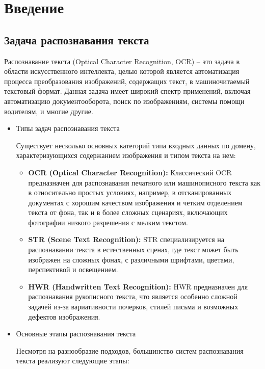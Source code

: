 \section{Введение}
\label{sec:Chapter0} 
\subsection{Задача распознавания текста}
Распознавание текста (Optical Character Recognition, OCR) -- это задача в области искусственного интеллекта, целью которой является автоматизация процесса преобразования изображений, содержащих текст, в машиночитаемый текстовый формат. Данная задача  имеет  широкий  спектр  применений,  включая  автоматизацию  документооборота,  поиск  по  изображениям,  системы  помощи  водителям,  и  многие  другие.
\begin{itemize}

    \item Типы задач распознавания текста

    Существует несколько основных категорий типа входных данных по домену,  характеризующихся содержанием изображения и типом текста на нем:

    \begin{itemize}
        \item \textbf{OCR (Optical Character Recognition):}  Классический  OCR  предназначен  для  распознавания  печатного  или  машинописного  текста как в  относительно  простых  условиях,  например,  в  отсканированных  документах  с  хорошим  качеством  изображения  и  четким  отделением  текста  от  фона,  так и в более сложных сценариях, включающих фотографии низкого разрешения с мелким текстом. 
        \item \textbf{STR (Scene Text Recognition):}  STR  специализируется  на  распознавании  текста  в  естественных  сценах,  где  текст  может  быть  изображен  на  сложных  фонах,  с  различными  шрифтами,  цветами,  перспективой  и  освещением. 
        \item \textbf{HWR (Handwritten Text Recognition):}  HWR  предназначен  для  распознавания  рукописного  текста,  что  является  особенно  сложной  задачей  из-за  вариативности  почерков,  стилей  письма  и  возможных  дефектов  изображения. 
    \end{itemize}

    \item{Основные этапы распознавания текста}

    Несмотря  на  разнообразие  подходов,  большинство  систем  распознавания  текста  реализуют  следующие  этапы:


\end{itemize}
